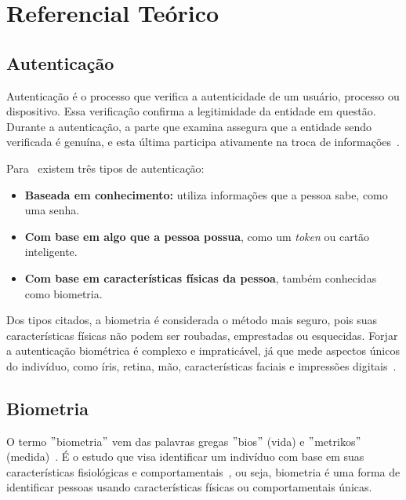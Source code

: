 

\chapter{Referencial Teórico}\label{ch:referencial_teorico}


\section{Autenticação}\label{sec:autenticacao}
Autenticação é o processo que verifica a autenticidade de um usuário, processo ou dispositivo.
Essa verificação confirma a legitimidade da entidade em questão.
Durante a autenticação, a parte que examina assegura que a entidade sendo verificada é genuína, e esta última participa ativamente na troca de informações~\cite{usmonov2021identification}.

Para~\cite{conti2017biometric} existem três tipos de autenticação:

\begin{itemize}
    \item \textbf{Baseada em conhecimento:} utiliza informações que a pessoa sabe, como uma senha.
    \item \textbf{Com base em algo que a pessoa possua}, como um \textit{token} ou cartão inteligente.
    \item \textbf{Com base em características físicas da pessoa}, também conhecidas como biometria.
\end{itemize}

Dos tipos citados, a biometria é considerada o método mais seguro, pois suas características físicas não podem ser roubadas, emprestadas ou esquecidas.
Forjar a autenticação biométrica é complexo e impraticável, já que mede aspectos únicos do indivíduo, como íris, retina, mão, características faciais e impressões digitais~\cite{dos2019tecnologias}.


\section{Biometria}\label{sec:biometria}
O termo \("\)biometria\("\) vem das palavras gregas \("\)bios\("\) (vida) e \("\)metrikos\("\) (medida)~\cite{magalhaes2003biometria}.
É o estudo que visa identificar um indivíduo com base em suas características fisiológicas e comportamentais~\cite{handa2019comparative}, ou seja, biometria é uma forma de identificar pessoas usando características físicas ou comportamentais únicas.


